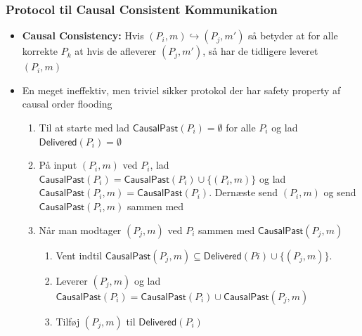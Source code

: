 \documentclass[a4, english]{article}
\begin{document}
\begin{itemize}
\end{itemize}

\subsubsection{Protocol til Causal Consistent Kommunikation}
\begin{itemize}
	\item \textbf{Causal Consistency:} Hvis $(P_i,m) \hookrightarrow (P_j,m')$ så betyder at for alle korrekte $P_k$ at hvis de afleverer $(P_j,m')$, så har de tidligere leveret $(P_i,m)$
  \item En meget ineffektiv, men triviel sikker protokol der har safety property af causal order flooding
  \begin{enumerate}
  	\item Til at starte med lad $\mathsf{CausalPast}(P_i) = \emptyset$ for alle $P_i$ og lad $\mathsf{Delivered}(P_i) = \emptyset$
  	\item På input $(P_i,m)$ ved $P_i$, lad $\mathsf{CausalPast}(P_i)= \mathsf{CausalPast}(P_i) \cup \{(P_i,m) \}$ og lad  $\mathsf{CausalPast}(P_i,m)=\mathsf{CausalPast}(P_i)$. Dernæste send $(P_i, m)$ og send  $\mathsf{CausalPast}(P_i,m)$ sammen med
  	\item Når man modtager $(P_j,m)$ ved $P_i$ sammen med $\mathsf{CausalPast}(P_j,m)$ 
    \begin{enumerate}
    	\item Vent indtil $\mathsf{CausalPast}(P_j,m) \subseteq \mathsf{Delivered}(Pi) \cup \{ (P_j,m) \}$.
      \item Leverer $(P_j,m)$ og lad  $\mathsf{CausalPast}(P_i) = \mathsf{CausalPast}(P_i) \cup \mathsf{CausalPast}(P_j,m)$
      \item Tilføj $(P_j,m)$ til $\mathsf{Delivered}(P_i)$
    \end{enumerate}
  \end{enumerate}  
\end{itemize}
\end{document}
